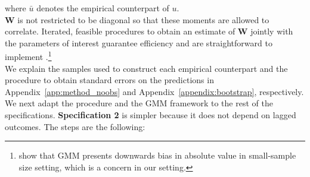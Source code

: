\noindent where $\bar{u}$ denotes the empirical counterpart of $u$.\\

\noindent $\bm{W}$ is not restricted to be diagonal so that these moments are allowed to correlate. Iterated, feasible procedures to obtain an estimate of $\bm{W}$ jointly with the parameters of interest guarantee efficiency and are straightforward to implement \citep{Hansen_1982_Econometrica,Amemiya_1985_advanced}.\footnote{\citet{Altonji_Segal_1996_JoBaES} show that GMM presents downwards bias in absolute value in small-sample size setting, which is a concern in our setting.}\\

\noindent We explain the samples used to construct each empirical counterpart and the procedure to obtain standard errors on the predictions in Appendix~\ref{app:method_noobs} and Appendix~\ref{appendix:bootstrap}, respectively.\\

\noindent We next adapt the procedure and the GMM framework to the rest of the specifications. \textbf{Specification 2} is simpler because it does not depend on lagged outcomes. The steps are the following:

